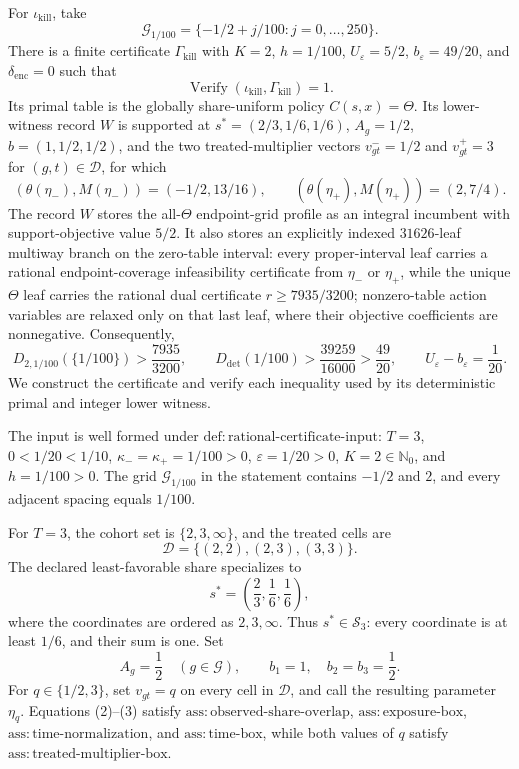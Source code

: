 For \(\iota_{\mathrm{kill}}\), take
\[
 \mathcal G_{1/100}=\{-1/2+j/100:j=0,\ldots,250\}.
\]
There is a finite certificate \(\Gamma_{\mathrm{kill}}\) with \(K=2\), \(h=1/100\), \(U_\varepsilon=5/2\), \(b_\varepsilon=49/20\), and \(\delta_{\mathrm{enc}}=0\) such that
\[
 \operatorname{Verify}(\iota_{\mathrm{kill}},\Gamma_{\mathrm{kill}})=1.
\]
Its primal table is the globally share-uniform policy \(C(s,x)=\Theta\). Its lower-witness record \(W\) is supported at \(s^*=(2/3,1/6,1/6)\), \(A_g=1/2\), \(b=(1,1/2,1/2)\), and the two treated-multiplier vectors \(v^-_{gt}=1/2\) and \(v^+_{gt}=3\) for \((g,t)\in\mathcal D\), for which
\[
 (\theta(\eta_-),M(\eta_-))=(-1/2,13/16),\qquad
 (\theta(\eta_+),M(\eta_+))=(2,7/4).
\]
The record \(W\) stores the all-\(\Theta\) endpoint-grid profile as an integral incumbent with support-objective value \(5/2\). It also stores an explicitly indexed \(31626\)-leaf multiway branch on the zero-table interval: every proper-interval leaf carries a rational endpoint-coverage infeasibility certificate from \(\eta_-\) or \(\eta_+\), while the unique \(\Theta\) leaf carries the rational dual certificate \(r\ge7935/3200\); nonzero-table action variables are relaxed only on that last leaf, where their objective coefficients are nonnegative. Consequently,
\[
 D_{2,1/100}(\{1/100\})>\frac{7935}{3200},
 \qquad
 D_{\mathrm{det}}(1/100)>\frac{39259}{16000}>\frac{49}{20},
 \qquad
 U_\varepsilon-b_\varepsilon=\frac1{20}.
\]
We construct the certificate and verify each inequality used by its deterministic primal and integer lower witness.

The input is well formed under \(\mathrm{def{:}rational\text{-}certificate\text{-}input}\): \(T=3\), \(0<1/20<1/10\), \(\kappa_-=\kappa_+=1/100>0\), \(\varepsilon=1/20>0\), \(K=2\in\mathbb N_0\), and \(h=1/100>0\). The grid \(\mathcal G_{1/100}\) in the statement contains \(-1/2\) and \(2\), and every adjacent spacing equals \(1/100\).

For \(T=3\), the cohort set is \(\{2,3,\infty\}\), and the treated cells are
\[
 \mathcal D=\{(2,2),(2,3),(3,3)\}.
\tag{1}
\]
The declared least-favorable share specializes to
\[
 s^*=\left(\frac23,\frac16,\frac16\right),
\tag{2}
\]
where the coordinates are ordered as \(2,3,\infty\). Thus \(s^*\in\mathcal S_3\): every coordinate is at least \(1/6\), and their sum is one. Set
\[
 A_g=\frac12\quad(g\in\mathcal G),\qquad
 b_1=1,\quad b_2=b_3=\frac12.
\tag{3}
\]
For \(q\in\{1/2,3\}\), set \(v_{gt}=q\) on every cell in \(\mathcal D\), and call the resulting parameter \(\eta_q\). Equations (2)--(3) satisfy \(\mathrm{ass{:}observed\text{-}share\text{-}overlap}\), \(\mathrm{ass{:}exposure\text{-}box}\), \(\mathrm{ass{:}time\text{-}normalization}\), and \(\mathrm{ass{:}time\text{-}box}\), while both values of \(q\) satisfy \(\mathrm{ass{:}treated\text{-}multiplier\text{-}box}\).

